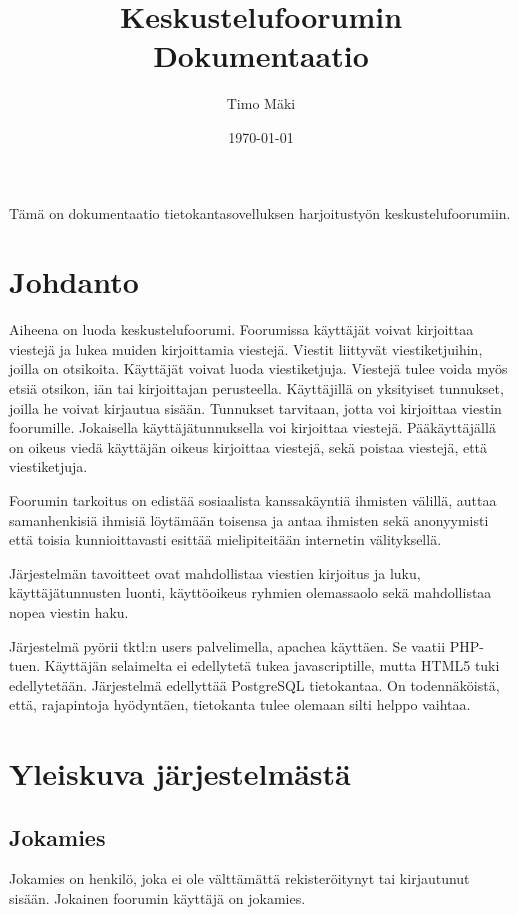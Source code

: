 \documentclass[a4paper, 12pt, finnish]{article}
\title{Keskustelufoorumin Dokumentaatio}
\author{Timo Mäki}
\date{\today}
\begin{document}
 \maketitle

Tämä on dokumentaatio tietokantasovelluksen harjoitustyön keskustelufoorumiin.

\newpage\null\thispagestyle{empty}\newpage
\tableofcontents
\newpage\null\thispagestyle{empty}\newpage
\section{Johdanto}

Aiheena on luoda keskustelufoorumi.
Foorumissa käyttäjät voivat kirjoittaa viestejä ja lukea muiden kirjoittamia viestejä.
Viestit liittyvät viestiketjuihin, joilla on otsikoita.
Käyttäjät voivat luoda viestiketjuja.
Viestejä tulee voida myös etsiä otsikon, iän tai kirjoittajan perusteella. Käyttäjillä on yksityiset tunnukset, joilla he voivat kirjautua sisään.
Tunnukset tarvitaan, jotta voi kirjoittaa viestin foorumille.
Jokaisella käyttäjätunnuksella voi kirjoittaa viestejä.
Pääkäyttäjällä on oikeus viedä käyttäjän oikeus kirjoittaa viestejä, sekä poistaa viestejä, että viestiketjuja.
\indent

Foorumin tarkoitus on edistää sosiaalista kanssakäyntiä ihmisten välillä, auttaa samanhenkisiä ihmisiä löytämään toisensa ja antaa ihmisten sekä anonyymisti että toisia kunnioittavasti esittää mielipiteitään internetin välityksellä.
\indent

Järjestelmän tavoitteet ovat mahdollistaa viestien kirjoitus ja luku, käyttäjätunnusten luonti, käyttöoikeus ryhmien olemassaolo sekä mahdollistaa nopea viestin haku.
\indent

Järjestelmä pyörii tktl:n users palvelimella, apachea käyttäen.
Se vaatii PHP-tuen.
Käyttäjän selaimelta ei edellytetä tukea javascriptille, mutta HTML5 tuki edellytetään.
Järjestelmä edellyttää PostgreSQL tietokantaa.
On todennäköistä, että, rajapintoja hyödyntäen, tietokanta tulee olemaan silti helppo vaihtaa.

\newpage
\section{Yleiskuva järjestelmästä}
\subsection{Jokamies}
Jokamies on henkilö, joka ei ole välttämättä rekisteröitynyt tai kirjautunut sisään.
Jokainen foorumin käyttäjä on jokamies.
\end{document}
